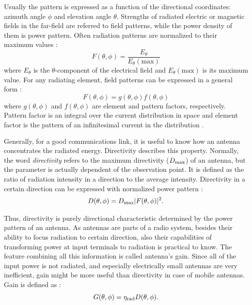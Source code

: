 Usually the pattern is expressed as a function of the directional coordinates: azimuth angle $\phi$ and elevation angle $\theta$. Strengths of radiated electric or magnetic fields in the far-field are referred to field patterns, while the power density of them is power pattern. Often radiation patterns are normalized to their maximum values \cite{stutzman}:
\begin{equation}
\label{eq:f_norm}
    F(\theta,\phi)=\frac{E_\theta}{E_\theta(\mathrm{max})}
\end{equation}
where $E_\theta$ is the $\theta$-component of the electrical field and $E_\theta(\mathrm{max})$ is its maximum value. For any radiating element, field patterns can be expressed in a general form \cite{stutzman}:
\begin{equation}
\label{eq:f_gen}
    F(\theta,\phi) = g(\theta,\phi)f(\theta,\phi)
\end{equation}
where $g(\theta,\phi)$ and $f(\theta,\phi)$ are element and pattern factors, respectively. Pattern factor is an integral over the current distribution in space and element factor is the pattern of an infinitesimal current in the distribution \cite{stutzman}.

Generally, for a good communications link, it is useful to know how an antenna concentrates the radiated energy. Directivity describes this property. Normally, the word \textit{directivity} refers to the maximum directivity (${D}_{\mathrm{max}}$) of an antenna, but the parameter is actually dependent of the observation point. It is defined as the ratio of radiation intensity in a direction to the average intensity. Directivity in a certain direction can be expressed with normalized power pattern \cite{stutzman}:
\begin{equation}
\label{eq:dir}
    D(\theta, \phi) = {D}_{\mathrm{max}}|F(\theta,\phi)|^2.
\end{equation}

Thus, directivity is purely directional characteristic determined by the power pattern of an antenna. As antennas are parts of a radio system, besides their ability to focus radiation to certain direction, also their capabilities of transforming power at input terminals to radiation is practical to know. The feature combining all this information is called antenna's gain. Since all of the input power is not radiated, and especially electrically small antennas are very inefficient, gain might be more useful than directivity in case of mobile antennas. Gain is defined as \cite{stutzman}:
\begin{equation}
    \label{eq:gain}
    G(\theta,\phi) = {\eta}_{\mathrm{rad}}D(\theta,\phi).
\end{equation}

